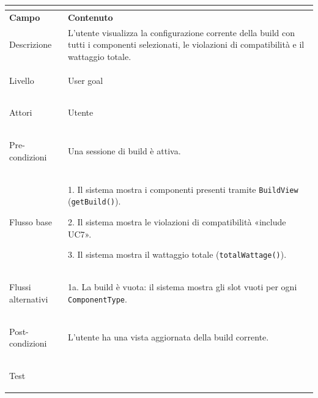\documentclass[11pt, a4paper]{article}
\begin{document}
\vspace{10pt}




\noindent

\begin{tabularx}{\textwidth}{|>{\bfseries}p{3.8cm}|X|}

\hline

\multicolumn{2}{|l|}{\textbf{UC6 --- Visualizza build}} \\

\hline

Campo & \textbf{Contenuto} \\

\hline

Descrizione & L'utente visualizza la configurazione corrente della build con tutti i componenti selezionati, le violazioni di compatibilità e il wattaggio totale. \\

\hline

Livello & User goal \\

\hline

Attori & Utente \\

\hline

Pre-condizioni & Una sessione di build è attiva. \\

\hline

Flusso base & 

1. Il sistema mostra i componenti presenti tramite \texttt{BuildView} (\texttt{getBuild()}).\newline

2. Il sistema mostra le violazioni di compatibilità «include UC7».\newline

3. Il sistema mostra il wattaggio totale (\texttt{totalWattage()}). \\

\hline

Flussi alternativi & 1a. La build è vuota: il sistema mostra gli slot vuoti per ogni \texttt{ComponentType}. \\

\hline

Post-condizioni & L'utente ha una vista aggiornata della build corrente. \\

\hline

Test & \\

\hline

\end{tabularx}
\end{document}
